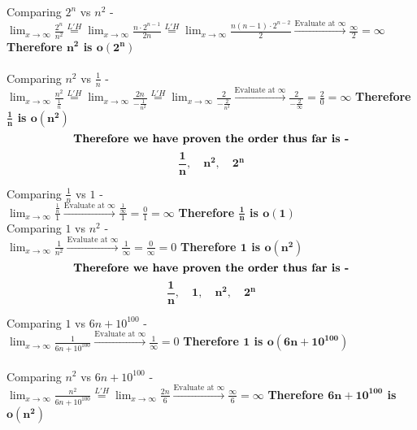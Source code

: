 \documentclass[9pt]{article}
\begin{document}
Comparing $2^n$ vs $n^2$ - \\
$ \displaystyle \lim_{x \to \infty} \frac{2^n}{n^2} \stackrel{L'H}{=} \lim_{x \to \infty} \frac{n\cdot 2^{n-1}}{2n} \stackrel{L'H}{=} \lim_{x \to \infty} \frac{n(n-1)\cdot 2^{n-2}}{2} \stackrel{\text{Evaluate at }\infty}{\rightarrow} \frac{\infty}{2} = \infty$ \hfill \textbf{Therefore $\mathbf{n^2}$ is $\mathbf{o(2^n)}$}\\
\\Comparing $n^2$ vs $\frac{1}{n}$ - \\
$ \displaystyle \lim_{x \to \infty} \frac{n^2}{\frac{1}{n}} \stackrel{L'H}{=} \lim_{x \to \infty} \frac{2n}{-\frac{1}{n^2}} \stackrel{L'H}{=} \lim_{x \to \infty} \frac{2}{-\frac{2}{n^3}} \stackrel{\text{Evaluate at }\infty}{\rightarrow} \frac{2}{-\frac{2}{\infty}} = \frac{2}{0} = \infty$ \hfill \textbf{Therefore $\mathbf{\frac{1}{n}}$ is $\mathbf{o(n^2)}$}\\

$$\text{\textbf{Therefore we have proven the order thus far is -}} $$
$$\mathbf{\frac{1}{n},\quad n^2,\quad 2^n}$$

Comparing $\frac{1}{n}$ vs $1$ - \\
$ \displaystyle \lim_{x \to \infty} \frac{\frac{1}{n}}{1}  \stackrel{\text{Evaluate at }\infty}{\rightarrow} \frac{\frac{1}{\infty}}{1} = \frac{0}{1} = \infty$ \hfill \textbf{Therefore $\mathbf{\frac{1}{n}}$ is $\mathbf{o(1)}$}\\
Comparing $1$ vs $n^2$ - \\
$ \displaystyle \lim_{x \to \infty} \frac{1}{n^2}  \stackrel{\text{Evaluate at }\infty}{\rightarrow} \frac{1}{\infty} = \frac{0}{\infty} = 0$ \hfill \textbf{Therefore $\mathbf{1}$ is $\mathbf{o(n^2)}$}\\

$$\text{\textbf{Therefore we have proven the order thus far is -}} $$
$$\mathbf{\frac{1}{n},\quad 1 ,\quad n^2,\quad 2^n}$$

\newpage

Comparing $1$ vs $6n+10^{100}$ - \\
$ \displaystyle \lim_{x \to \infty} \frac{1}{6n+10^{100}} \stackrel{\text{Evaluate at }\infty}{\rightarrow} \frac{1}{\infty} = 0$ \hfill \textbf{Therefore $\mathbf{1}$ is $\mathbf{o(6n+10^{100})}$}\\
\\Comparing $n^2$ vs $6n+10^{100}$ - \\
$ \displaystyle \lim_{x \to \infty} \frac{n^2}{6n+10^{100}} \stackrel{L'H}{=} \lim_{x \to \infty} \frac{2n}{6} \stackrel{\text{Evaluate at }\infty}{\rightarrow} \frac{\infty}{6} = \infty$ \hfill \textbf{Therefore $\mathbf{6n+10^{100}}$ is $\mathbf{o(n^2)}$}\\
\end{document}

